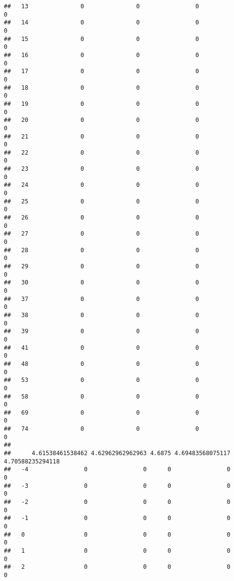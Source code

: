 \documentclass[]{article}
\begin{document}
\begin{verbatim}
##   13               0               0                0                0
##   14               0               0                0                0
##   15               0               0                0                0
##   16               0               0                0                0
##   17               0               0                0                0
##   18               0               0                0                0
##   19               0               0                0                0
##   20               0               0                0                0
##   21               0               0                0                0
##   22               0               0                0                0
##   23               0               0                0                0
##   24               0               0                0                0
##   25               0               0                0                0
##   26               0               0                0                0
##   27               0               0                0                0
##   28               0               0                0                0
##   29               0               0                0                0
##   30               0               0                0                0
##   37               0               0                0                0
##   38               0               0                0                0
##   39               0               0                0                0
##   41               0               0                0                0
##   48               0               0                0                0
##   53               0               0                0                0
##   58               0               0                0                0
##   69               0               0                0                0
##   74               0               0                0                0
##     
##      4.61538461538462 4.62962962962963 4.6875 4.69483568075117 4.70588235294118
##   -4                0                0      0                0                0
##   -3                0                0      0                0                0
##   -2                0                0      0                0                0
##   -1                0                0      0                0                0
##   0                 0                0      0                0                0
##   1                 0                0      0                0                0
##   2                 0                0      0                0                0

\end{verbatim}
\end{document}
